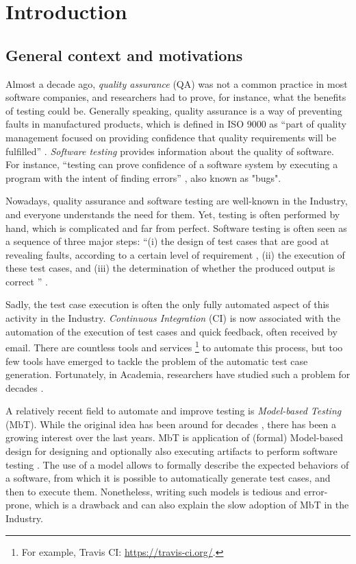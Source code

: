 %
\chapter{Introduction}
\label{sec:intro}

\minitoc

\section{General context and motivations}

Almost a decade ago, \emph{quality assurance} (QA) was not a
common practice in most software companies, and researchers had
to prove, for instance, what the benefits of testing could be.
Generally speaking, quality assurance is a way of preventing
faults in manufactured products, which is defined in ISO 9000 as
\enquote{part of quality management focused on providing confidence that
quality requirements will be fulfilled} \cite{iso20059000}.
\emph{Software testing} provides information about the quality of
software. For instance, \enquote{testing can prove confidence of
a software system by executing a program with the intent of
finding errors} \cite{Myers:1979:AST:539883}, also known as
"bugs".

Nowadays, quality assurance and software testing are well-known
in the Industry, and everyone understands the need for them.
Yet, testing is often performed by hand, which is complicated and
far from perfect. Software testing is often seen as a sequence of
three major steps: \enquote{(i) the design of test cases that
are good at revealing faults, according to a certain level of
requirement \cite{kaner2003good}, (ii) the execution of these
test cases, and (iii) the determination of whether the
produced output is correct \cite{weyuker1982testing}}
\cite{lakhotia2009search}.

Sadly, the test case execution is often the only fully automated
aspect of this activity in the Industry. \emph{Continuous
Integration} (CI) \cite{booch1991object} is now associated with
the automation of the execution of test cases and quick feedback,
often received by email. There are countless tools and services
\footnote{For example, Travis CI: \url{https://travis-ci.org/}.}
to automate this process, but too few tools have emerged to
tackle the problem of the automatic test case generation.
Fortunately, in Academia, researchers have studied such a problem
for decades \cite{4221614}.

A relatively recent field to automate and improve testing is
\emph{Model-based Testing} (MbT). While the original idea has
been around for decades \cite{moore56}, there has been a growing
interest over the last years.  MbT is application of (formal)
Model-based design for designing and optionally also executing
artifacts to perform software testing
\cite{Jorgensen:1995:STC:526521}. The use of a model allows to
formally describe the expected behaviors of a software, from
which it is possible to automatically generate test cases,
and then to execute them.  Nonetheless, writing such models is
tedious and error-prone, which is a drawback and can also explain
the slow adoption of MbT in the Industry.

